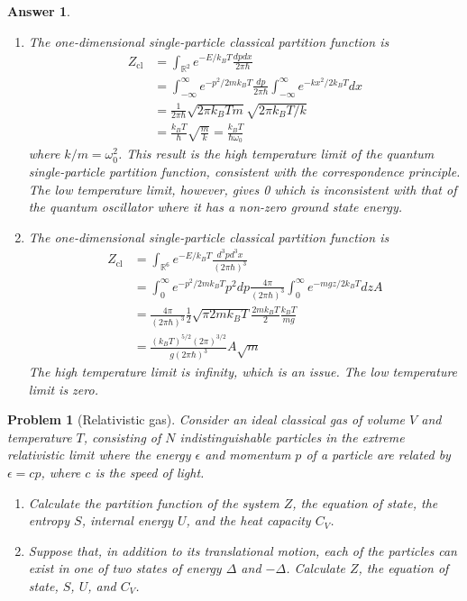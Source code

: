 \documentclass[a4paper]{article}
\newtheorem{ans}{Answer}[section]
\theoremstyle{new}
\newtheorem{qns}{Problem}[section]
\begin{document}
\begin{ans}\leavevmode
\begin{enumerate}[label=(\alph*)]
\item The one-dimensional single-particle classical partition function is
\begin{align}
    Z_{\text{cl}}&=\int_{\mathbb{R}^2} e^{-E/k_BT}\frac{dpdx}{2\pi\hbar}\nonumber\\&=\int_{-\infty}^\infty e^{-p^2/2mk_BT}\frac{dp}{2\pi\hbar}\int_{-\infty}^\infty e^{-kx^2/2k_BT}dx\nonumber\\&=\frac{1}{2\pi\hbar}\sqrt{2\pi k_BTm}\sqrt{2\pi k_BT/k}\nonumber\\&=\frac{k_BT}{\hbar}\sqrt{\frac{m}{k}}=\frac{k_BT}{\hbar\omega_0}\nonumber
\end{align}
where $k/m=\omega_0^2$. This result is the high temperature limit of the quantum single-particle partition function, consistent with the correspondence principle. The low temperature limit, however, gives 0 which is inconsistent with that of the quantum oscillator where it has a non-zero ground state energy.
\item The one-dimensional single-particle classical partition function is
\begin{align}
    Z_{\text{cl}}&=\int_{\mathbb{R}^6} e^{-E/k_BT}\frac{d^3pd^3x}{(2\pi\hbar)^3}\nonumber\\&=\int_{0}^\infty e^{-p^2/2mk_BT}p^2dp\frac{4\pi}{(2\pi\hbar)^3}\int_{0}^\infty e^{-mgz/2k_BT}dzA\nonumber\\&=\frac{4\pi}{(2\pi\hbar)^3}\frac{1}{2}\sqrt{\pi2mk_BT}\frac{2mk_BT}{2}\frac{k_BT}{mg}\nonumber\\&=\frac{(k_BT)^{5/2}(2\pi)^{3/2}}{g(2\pi\hbar)^3}A\sqrt{m}\nonumber
\end{align}
The high temperature limit is infinity, which is an issue. The low temperature limit is zero.
\end{enumerate}
\end{ans}
\newpage
\begin{qns}[Relativistic gas]
Consider an ideal classical gas of volume $V$ and temperature $T$, consisting of $N$ indistinguishable particles in the extreme relativistic limit where the energy $\epsilon$ and momentum $p$ of a particle are related by $\epsilon= cp$, where $c$ is the speed of light.
\begin{enumerate}[label=(\alph*)]
\item Calculate the partition function of the system $Z$, the equation of state, the entropy $S$, internal energy $U$, and the heat capacity $C_V$.
\item Suppose that, in addition to its translational motion, each of the particles can exist in one of two states of energy $\Delta$ and $-\Delta$. Calculate $Z$, the equation of state, $S$, $U$, and $C_V$.
\end{enumerate}
\end{qns}
\end{document}

